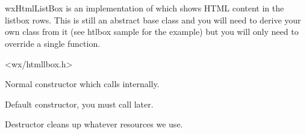 
\section{}\label{wxhtmllistbox}

wxHtmlListBox is an implementation of  which
shows HTML content in the listbox rows. This is still an abstract base class
and you will need to derive your own class from it (see htlbox sample for the
example) but you will only need to override a single 
 function.




<wx/htmllbox.h>




\label{wxhtmllistboxwxhtmllistbox}


Normal constructor which calls 
internally.


Default constructor, you must call 
later.


\label{wxhtmllistboxdtor}


Destructor cleans up whatever resources we use.


\label{wxhtmllistboxcreate}

